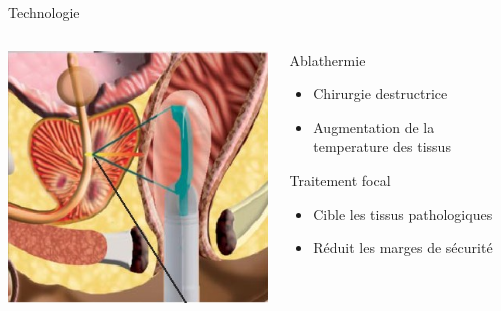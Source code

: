 \documentclass{beamer}
\begin{document}
\begin{frame}{Technologie}
  \centering
  \begin{columns}[T]
 \begin{column}{0.5\textwidth}
\includegraphics[height=0.5\textheight]{images/hifu.jpg}
 \end{column}
 \begin{column}{0.5\textwidth}
\begin{block}{Ablathermie}
\begin{itemize}
  \item Chirurgie destructrice
  \item Augmentation de la temperature des tissus
  \end{itemize}
\end{block}
\begin{block}{Traitement focal}
\begin{itemize}
  \item Cible les tissus pathologiques
  \item Réduit les marges de sécurité
  \end{itemize}
\end{block}
\end{column}
\end{columns}
 
\end{frame}
\end{document}
